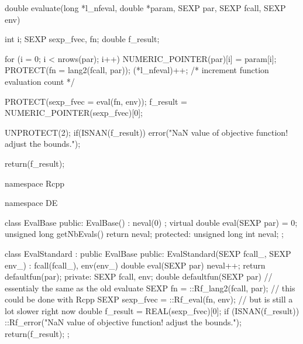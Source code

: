 \documentclass[nojss,shortnames,article]{jss}
\begin{document}
\begin{sidewaysfigure}          %
  \begin{minipage}{0.40\linewidth}
    \tiny
    \begin{CodeChunk}
      \begin{CodeInput}
double evaluate(long *l_nfeval, double *param, SEXP par, SEXP fcall, SEXP env)
{
   int i;
   SEXP sexp_fvec, fn;
   double f_result;  

   for (i = 0; i < nrows(par); i++) {
      NUMERIC_POINTER(par)[i] = param[i];
   }
   PROTECT(fn = lang2(fcall, par)); 
      (*l_nfeval)++;  /* increment function evaluation count */

   PROTECT(sexp_fvec = eval(fn, env)); 
   f_result = NUMERIC_POINTER(sexp_fvec)[0];
   
   UNPROTECT(2);
   if(ISNAN(f_result))
     error("NaN value of objective function! \nPerhaps adjust the bounds.");
   
   return(f_result); 
}
      \end{CodeInput}
    \end{CodeChunk}

    \normalsize {} \tiny 
  \end{minipage}
  \begin{minipage}{0.03\linewidth}
    \phantom{XX}
  \end{minipage}
  \begin{minipage}{0.56\linewidth}
    \tiny

    \begin{CodeChunk}
      \begin{CodeInput}
namespace Rcpp {
    namespace DE {

	class EvalBase { 
	public:
	    EvalBase() : neval(0) {};
	    virtual double eval(SEXP par) = 0;
	    unsigned long getNbEvals() { return neval; }
        protected:
            unsigned long int neval;
	};

	class EvalStandard : public EvalBase {
	public:
	    EvalStandard(SEXP fcall_, SEXP env_) : fcall(fcall_), env(env_) {} 
	    double eval(SEXP par) {
		neval++;
		return defaultfun(par);
	    }
	private:
	    SEXP fcall, env;
	    double defaultfun(SEXP par) { 		// essentialy the same as the old evaluate
		SEXP fn = ::Rf_lang2(fcall, par); 	// this could be done with Rcpp 
		SEXP sexp_fvec = ::Rf_eval(fn, env);	// but is still a lot slower right now
		double f_result = REAL(sexp_fvec)[0];
		if (ISNAN(f_result)) 
		    ::Rf_error("NaN value of objective function! \nPerhaps adjust the bounds.");
		return(f_result); 
	    }
	};

}}
\end{CodeInput}
\end{CodeChunk}
\end{minipage}
\end{sidewaysfigure}
\end{document}
